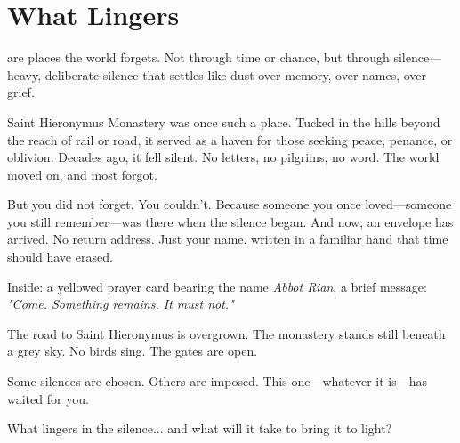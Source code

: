 \documentclass[twocolumn,nodeprecatedcode,bg=print]{dndbook/dndbook}
\begin{document}
\DndSetThemeColor[DmgSlateGray]
\chapter*{What Lingers}
\begin{WyrdSettingHeading}
     are places the world forgets. Not through time or chance, but through silence—heavy, deliberate silence that settles like dust over memory, over names, over grief.

    \noindent
    Saint Hieronymus Monastery was once such a place. Tucked in the hills beyond the reach of rail or road, it served as a haven for those seeking peace, penance, or oblivion. Decades ago, it fell silent. No letters, no pilgrims, no word. The world moved on, and most forgot.

    But you did not forget. You couldn’t. Because someone you once loved—someone you still remember—was there when the silence began. And now, an envelope has arrived. No return address. Just your name, written in a familiar hand that time should have erased.

    Inside: a yellowed prayer card bearing the name \emph{Abbot Rian}, a brief message: \textit{"Come. Something remains. It must not."}

    The road to Saint Hieronymus is overgrown. The monastery stands still beneath a grey sky. No birds sing. The gates are open.

    Some silences are chosen. Others are imposed. This one—whatever it is—has waited for you.

    What lingers in the silence... and what will it take to bring it to light?
\end{WyrdSettingHeading}
\end{document}
